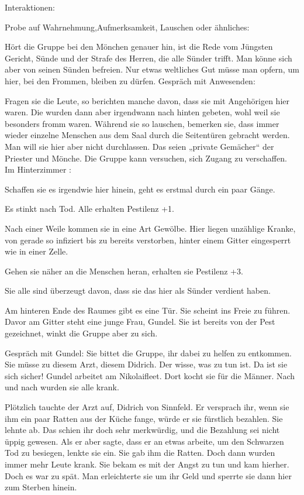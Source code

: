 Interaktionen:

Probe auf Wahrnehmung,Aufmerksamkeit, Lauschen oder ähnliches:

Hört die Gruppe bei den Mönchen genauer hin, ist die Rede vom Jüngsten Gericht,
Sünde und der Strafe des Herren, die alle Sünder trifft.
Man könne sich aber von seinen Sünden befreien.
Nur etwas weltliches Gut müsse man opfern, um hier,
bei den Frommen, bleiben zu dürfen.
Gespräch mit Anwesenden:

Fragen sie die Leute, so berichten manche davon, dass sie mit Angehörigen hier waren.
Die wurden dann aber irgendwann nach hinten gebeten, wohl weil sie besonders fromm waren. Während sie so lauschen, bemerken sie, dass immer wieder einzelne Menschen aus dem Saal durch die Seitentüren gebracht werden.
Man will sie hier aber nicht durchlassen. Das seien „private Gemächer“ der Priester und Mönche. Die Gruppe kann versuchen, sich Zugang zu verschaffen.
Im Hinterzimmer
:

Schaffen sie es irgendwie hier hinein, geht es erstmal durch ein paar Gänge.

Es stinkt nach Tod. Alle erhalten Pestilenz +1.

Nach einer Weile kommen sie in eine Art Gewölbe. Hier liegen unzählige Kranke, von gerade so infiziert bis zu bereits verstorben, hinter einem Gitter eingesperrt wie in einer Zelle.

Gehen sie näher an die Menschen heran, erhalten sie Pestilenz +3.

Sie alle sind überzeugt davon, dass sie das hier als Sünder verdient haben.

Am hinteren Ende des Raumes gibt es eine Tür. Sie scheint ins Freie zu führen. Davor am Gitter steht eine junge Frau, Gundel. Sie ist bereits von der Pest gezeichnet, winkt die Gruppe aber zu sich.

Gespräch mit Gundel: Sie bittet die Gruppe, ihr dabei zu helfen zu entkommen. Sie müsse zu diesem Arzt, diesem Didrich. Der wisse, was zu tun ist. Da ist sie sich sicher! Gundel arbeitet am Nikolaifleet. Dort kocht sie für die Männer. Nach und nach wurden sie alle krank.

Plötzlich tauchte der Arzt auf, Didrich von Sinnfeld. Er versprach ihr, wenn sie ihm ein paar Ratten aus der Küche fange, würde er sie fürstlich bezahlen. Sie lehnte ab. Das schien ihr doch sehr merkwürdig, und die Bezahlung sei nicht üppig gewesen. Als er aber sagte, dass er an etwas arbeite, um den Schwarzen Tod zu besiegen, lenkte sie ein. Sie gab ihm die Ratten. Doch dann wurden immer mehr Leute krank. Sie bekam es mit der Angst zu tun und kam hierher. Doch es war zu spät. Man erleichterte sie um ihr Geld und sperrte sie dann hier zum Sterben hinein.


